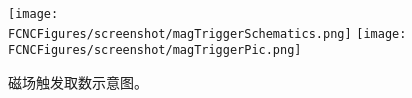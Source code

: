 
\begin{figure}[H]
\centering
\texttt{[image: \\FCNCFigures/screenshot/magTriggerSchematics.png]}
\texttt{[image: \\FCNCFigures/screenshot/magTriggerPic.png]}
\caption{磁场触发取数示意图。}
\label{fig:magTriggerSchematics}
\end{figure}